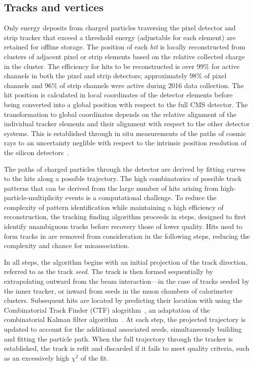 \subsection{Tracks and vertices}
Only energy deposits from charged particles traversing the pixel detector and
strip tracker that exceed a threshold energy (adjustable for each element)
are retained for offline storage. The position of each \emph{hit} is locally
reconstructed from clusters of adjacent pixel or strip elements based
on the relative collected charge in the cluster. 
The efficiency for hits to be reconstructed is over 99\% for active 
channels in both the pixel and strip detectors; approximately 98\%
of pixel channels and 96\% of strip channels were active during 2016 data collection.
The hit position is calculated
in local coordinates of the detector elements before being converted
into a global position with respect to the full CMS detector. The transformation
to global coordinates depends on the relative alignment of the individual tracker
elements and their alignment with respect to the other detector systems.
This is established through in situ measurements of the paths of cosmic rays
to an uncertainty neglible with respect to the intrinsic position resolution 
of the silicon detectors~\cite{Chatrchyan:2014wfa}.

The paths of charged particles through the detector are derived by 
fitting curves to the hits along a possible trajectory. 
The high combinatorics of possible track patterns that can be derived
from the large number of hits arising from high-particle-multiplicity
events is a computational challenge.
To reduce the complexity of pattern identification
while maintaining a high efficiency of reconstruction, the tracking finding
algorithm proceeds in steps, designed to first identify unambiguous
tracks before recovery those of lower quality.
Hits used to form tracks in are removed from consideration in the following
steps, reducing the complexity and chance for misassociation.

In all steps, the algorithm begins with an initial projection of the track
direction, referred to as the track \emph{seed}. The track is then formed
sequentially by extrapolating outward from the beam interaction---in the 
case of tracks seeded by the inner tracker, or inward from seeds in the muon
chambers of calorimeter clusters. Subsequent hits are located 
by predicting their location with using the
Combinatorial Track Finder (CTF) alogrithm~\cite{Chatrchyan:2014fea}, 
an adaptation of the combinatorial Kalman filter algorithm~\cite{}. 
At each step, the projected trajectory is updated to account for the additional
associated seeds, simultaneously building and fitting the particle path.
When the full trajectory through the tracker is established, the track
is refit and discarded if it fails to meet quality criteria, such as 
an excessively high $\chi^{2}$ of the fit.

